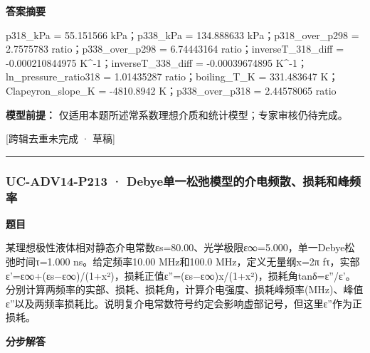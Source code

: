 \documentclass[UTF8,11pt,a4paper]{ctexart}
\begin{document}
\noindent\textbf{答案摘要}\par
p318\_kPa = 55.151566 kPa；p338\_kPa = 134.888633 kPa；p318\_over\_p298 = 2.7575783 ratio；p338\_over\_p298 = 6.74443164 ratio；inverseT\_318\_diff = -0.000210844975 K\textasciicircum{}-1；inverseT\_338\_diff = -0.00039674895 K\textasciicircum{}-1；ln\_pressure\_ratio318 = 1.01435287 ratio；boiling\_T\_K = 331.483647 K；Clapeyron\_slope\_K = -4810.8942 K；p338\_over\_p318 = 2.44578065 ratio\par
\noindent\textbf{模型前提：}
仅适用本题所述常系数理想介质和统计模型；专家审核仍待完成。\par
\noindent\textcolor{red!65!black}{[跨辑去重未完成 · 草稿]} \par
\medskip\hrule\medskip
{}
\subsubsection*{UC-ADV14-P213 · Debye单一松弛模型的介电频散、损耗和峰频率}
\noindent\textbf{题目}\par
某理想极性液体相对静态介电常数εs=80.00、光学极限ε∞=5.000，单一Debye松弛时间τ=1.000 ns。给定频率10.00 MHz和100.0 MHz，定义无量纲x=2π fτ，实部ε'=ε∞+(εs−ε∞)/(1+x²)，损耗正值ε''=(εs−ε∞)x/(1+x²)，损耗角tanδ=ε''/ε'。分别计算两频率的实部、损耗、损耗角，计算介电强度、损耗峰频率(MHz)、峰值ε''以及两频率损耗比。说明复介电常数符号约定会影响虚部记号，但这里ε''作为正损耗。\par
\medskip\noindent\textbf{分步解答}
\end{document}
